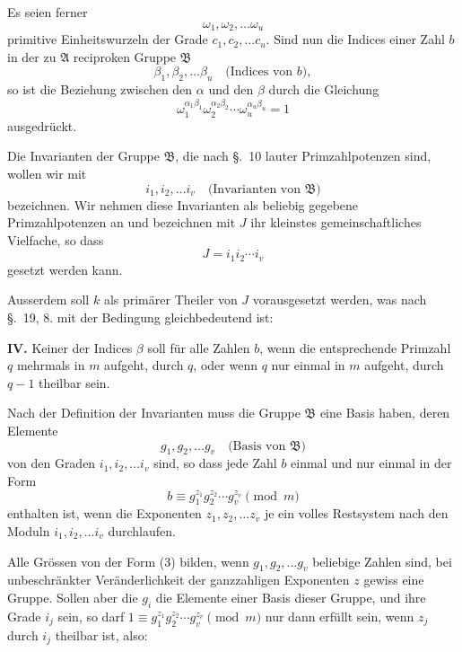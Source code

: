 \documentclass[12pt,a4paper]{article}
\theoremstyle{plain}
\theoremstyle{definition}
\theoremstyle{remark}
\begin{document}
Es seien ferner
\[
\omega_1, \omega_2, \ldots \omega_u
\]
primitive Einheitswurzeln der Grade $c_1, c_2, \ldots c_u$. Sind nun die Indices einer Zahl $b$ in der zu $\mathfrak{A}$ reciproken Gruppe $\mathfrak{B}$
\[
\beta_1, \beta_2, \ldots \beta_u \quad \text{(Indices von $b$)},
\]
so ist die Beziehung zwischen den $\alpha$ und den $\beta$ durch die Gleichung
\begin{equation}\tag{1}
\omega_1^{\alpha_1\beta_1} \omega_2^{\alpha_2\beta_2} \cdots \omega_u^{\alpha_u\beta_u} = 1
\end{equation}
ausgedrückt.

Die Invarianten der Gruppe $\mathfrak{B}$, die nach \S.~10 lauter Primzahlpotenzen sind, wollen wir mit
\[
i_1, i_2, \ldots i_v \quad \text{(Invarianten von $\mathfrak{B}$)}
\]
bezeichnen. Wir nehmen diese Invarianten als beliebig gegebene Primzahlpotenzen an und bezeichnen mit $J$ ihr kleinstes gemeinschaftliches Vielfache, so dass
\begin{equation}\tag{2}
J = i_1 i_2 \cdots i_v
\end{equation}
gesetzt werden kann.

Ausserdem soll $k$ als primärer Theiler von $J$ vorausgesetzt werden, was nach \S.~19, 8. mit der Bedingung gleichbedeutend ist:

\medskip\noindent\textbf{IV.} Keiner der Indices $\beta$ soll für alle Zahlen $b$, wenn die entsprechende Primzahl $q$ mehrmals in $m$ aufgeht, durch $q$, oder wenn $q$ nur einmal in $m$ aufgeht, durch $q-1$ theilbar sein.

\medskip
Nach der Definition der Invarianten muss die Gruppe $\mathfrak{B}$ eine Basis haben, deren Elemente
\[
g_1, g_2, \ldots g_v \quad \text{(Basis von $\mathfrak{B}$)}
\]
von den Graden $i_1, i_2, \ldots i_v$ sind, so dass jede Zahl $b$ einmal und nur einmal in der Form
\begin{equation}\tag{3}
b \equiv g_1^{z_1} g_2^{z_2} \cdots g_v^{z_v} \pmod{m}
\end{equation}
enthalten ist, wenn die Exponenten $z_1, z_2, \ldots z_v$ je ein volles Restsystem nach den Moduln $i_1, i_2, \ldots i_v$ durchlaufen.

Alle Grössen von der Form (3) bilden, wenn $g_1, g_2, \ldots g_v$ beliebige Zahlen sind, bei unbeschränkter Veränderlichkeit der ganzzahligen Exponenten $z$ gewiss eine Gruppe. Sollen aber die $g_i$ die Elemente einer Basis dieser Gruppe, und ihre Grade $i_j$ sein, so darf $1 \equiv g_1^{z_1} g_2^{z_2} \cdots g_v^{z_v} \pmod{m}$ nur dann erfüllt sein, wenn $z_j$ durch $i_j$ theilbar ist, also:
\end{document}
